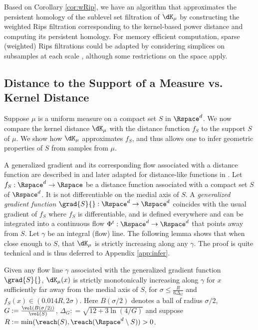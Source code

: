 \documentclass[11pt]{myclass}
\begin{document}
Based on Corollary \ref{cor:wRip}, we have an algorithm that approximates the persistent homology of the sublevel set filtration of $\dK_\mu$ by constructing the weighted Rips filtration corresponding to the kernel-based power distance and computing its persistent homology. 
For memory efficient computation, sparse (weighted) Rips filtrations could be adapted by considering simplices on subsamples at each scale \cite{Sheehy2013,ChazalSilvaGlisse2013}, although some restrictions on the space apply. 









\subsection{Distance to the Support of a Measure vs. Kernel Distance}
\label{sec:infer}
Suppose $\mu$ is a uniform measure on a compact set $S$ in $\Rspace^d$. 
We now compare the kernel distance $\dK_\mu$ with the distance function $f_S$ to the support $S$ of $\mu$. We show how $\dK_\mu$ approximates $f_S$, and thus allows one to infer geometric properties of $S$ from samples from $\mu$. 

A generalized gradient and its corresponding flow associated with a distance function are described in \cite{ChazalCohen-SteinerLieutier2009} and later adapted for distance-like functions in \cite{ChazalCohen-SteinerMerigot2011}. 
Let $f_S: \Rspace^d \to \Rspace$ be a distance function associated with a compact set $S$ of $\Rspace^d$. 
It is not differentiable on the medial axis of $S$. 
A \emph{generalized gradient function} $\grad{S}{}: \Rspace^d \to \Rspace^d$ coincides with the usual gradient of $f_S$ where $f_S$ is differentiable, and is defined everywhere and can be integrated into a continuous flow $\Phi^t: \Rspace^d \to \Rspace^d$ that points away from $S$.   
Let $\gamma$ be an integral (flow) line.  
The following lemma shows that when close enough to $S$, that $\dK_\mu$ is strictly increasing along any $\gamma$.  The proof is quite technical and is thus deferred to Appendix \ref{app:infer}.  

\begin{lemma}
Given any flow line $\gamma$ associated with the generalized gradient function $\grad{S}{}$, $\dK_\mu(x)$ is strictly monotonically increasing along $\gamma$ for $x$ sufficiently far away from the medial axis of $S$, for $\sigma \leq \frac{R}{6\Delta_G}$ and $ f_S(x) \in (0.014 R, 2\sigma)$. 
Here $B(\sigma/2)$ denotes a ball of radius $\sigma/2$,  $G := \frac{\vol(B(\sigma/2))}{\vol(S)}$, $\Delta_G : = \sqrt{12 + 3\ln(4/G)}$ and suppose $R := \min(\reach(S), \reach(\Rspace^d \setminus S)) > 0$.  
\label{lem:monotonicity}
\end{lemma}
\end{document}
